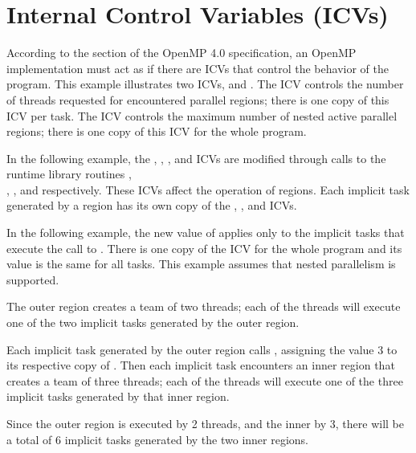 \section{Internal Control Variables (ICVs)}
\label{sec:icv}

According to the  section of the OpenMP 4.0 specification, an OpenMP implementation must act as if there are ICVs that control 
the behavior of the program.  This example illustrates two ICVs,  
and . The  ICV controls the 
number of threads requested for encountered parallel regions; there is one copy 
of this ICV per task. The  ICV controls the maximum 
number of nested active parallel regions; there is one copy of this ICV for the 
whole program.

In the following example, the , , 
, and  ICVs are modified through calls to 
the runtime library routines ,\\ , , 
and  respectively. These ICVs 
affect the operation of  regions. Each implicit task generated 
by a  region has its own copy of the , ,
and  ICVs.

In the following example, the new value of  applies only to 
the implicit tasks that execute the call to . There 
is one copy of the  ICV for the whole program and 
its value is the same for all tasks. This example assumes that nested parallelism 
is supported.

The outer  region creates a team of two threads; each of the threads 
will execute one of the two implicit tasks generated by the outer  
region.

Each implicit task generated by the outer  region calls , 
assigning the value 3 to its respective copy of . Then each 
implicit task encounters an inner  region that creates a team 
of three threads; each of the threads will execute one of the three implicit tasks 
generated by that inner  region.

Since the outer  region is executed by 2 threads, and the inner 
by 3, there will be a total of 6 implicit tasks generated by the two inner  
regions.

